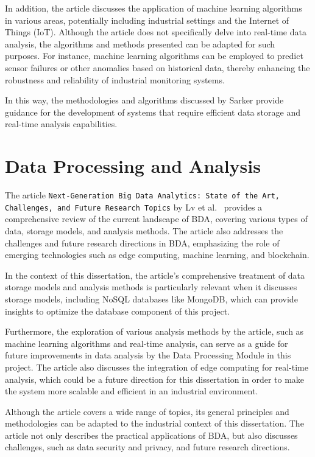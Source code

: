 In addition, the article discusses the application of machine learning algorithms in various areas, potentially including industrial settings and the Internet of Things (IoT). Although the article does not specifically delve into real-time data analysis, the algorithms and methods presented can be adapted for such purposes. For instance, machine learning algorithms can be employed to predict sensor failures or other anomalies based on historical data, thereby enhancing the robustness and reliability of industrial monitoring systems.

In this way, the methodologies and algorithms discussed by Sarker \cite{sarker2021machine} provide guidance for the development of systems that require efficient data storage and real-time analysis capabilities.

\section{Data Processing and Analysis}
The article \texttt{Next-Generation Big Data Analytics: State of the Art, Challenges, and Future Research Topics} by Lv et al.~\cite{Lv2017} provides a comprehensive review of the current landscape of \gls{BDA}, covering various types of data, storage models, and analysis methods. The article also addresses the challenges and future research directions in \gls{BDA}, emphasizing the role of emerging technologies such as edge computing, machine learning, and blockchain.

In the context of this dissertation, the article's comprehensive treatment of data storage models and analysis methods is particularly relevant when it discusses storage models, including NoSQL databases like MongoDB, which can provide insights to optimize the database component of this project.

Furthermore, the exploration of various analysis methods by the article, such as machine learning algorithms and real-time analysis, can serve as a guide for future improvements in data analysis by the Data Processing Module in this project. The article also discusses the integration of edge computing for real-time analysis, which could be a future direction for this dissertation in order to make the system more scalable and efficient in an industrial environment.

Although the article covers a wide range of topics, its general principles and methodologies can be adapted to the industrial context of this dissertation. The article not only describes the practical applications of \gls{BDA}, but also discusses challenges, such as data security and privacy, and future research directions.

